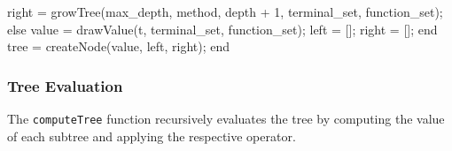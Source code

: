 \documentclass[
  letterpaper,
  DIV=11,
  numbers=noendperiod]{scrartcl}
\newenvironment{Shaded}{\begin{snugshade}}{\end{snugshade}}
\newcommand{\FloatTok}[1]{\textcolor[rgb]{0.68,0.00,0.00}{#1}}
\newcommand{\KeywordTok}[1]{\textcolor[rgb]{0.00,0.23,0.31}{#1}}
\newcommand{\NormalTok}[1]{\textcolor[rgb]{0.00,0.23,0.31}{#1}}
\newcommand{\OperatorTok}[1]{\textcolor[rgb]{0.37,0.37,0.37}{#1}}
\newcommand{\SpecialStringTok}[1]{\textcolor[rgb]{0.13,0.47,0.30}{#1}}
\newcommand{\VariableTok}[1]{\textcolor[rgb]{0.07,0.07,0.07}{#1}}
\begin{document}
\begin{Shaded}
\begin{Highlighting}[]
        \VariableTok{right} \OperatorTok{=} \VariableTok{growTree}\NormalTok{(}\VariableTok{max\_depth}\OperatorTok{,} \VariableTok{method}\OperatorTok{,} \VariableTok{depth} \OperatorTok{+} \FloatTok{1}\OperatorTok{,} \VariableTok{terminal\_set}\OperatorTok{,} \VariableTok{function\_set}\NormalTok{)}\OperatorTok{;}
    \KeywordTok{else}
        \VariableTok{value} \OperatorTok{=} \VariableTok{drawValue}\NormalTok{(}\SpecialStringTok{\textquotesingle{}t\textquotesingle{}}\OperatorTok{,} \VariableTok{terminal\_set}\OperatorTok{,} \VariableTok{function\_set}\NormalTok{)}\OperatorTok{;}
        \VariableTok{left} \OperatorTok{=}\NormalTok{ []}\OperatorTok{;}
        \VariableTok{right} \OperatorTok{=}\NormalTok{ []}\OperatorTok{;}
    \KeywordTok{end}
    \VariableTok{tree} \OperatorTok{=} \VariableTok{createNode}\NormalTok{(}\VariableTok{value}\OperatorTok{,} \VariableTok{left}\OperatorTok{,} \VariableTok{right}\NormalTok{)}\OperatorTok{;}
\KeywordTok{end}
\end{Highlighting}
\end{Shaded}

\subsubsection{Tree Evaluation}\label{tree-evaluation}

The \texttt{computeTree} function recursively evaluates the tree by
computing the value of each subtree and applying the respective
operator.
\end{document}
